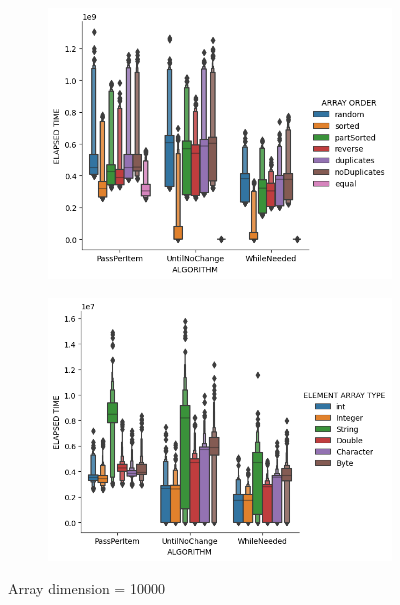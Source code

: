 \documentclass{article}
\begin{document}
\begin{figure}[H]
    \centering
    \begin{subfigure}[b]{0.4\textwidth}
        \centering
        \includegraphics[width=\textwidth]{./data/array_order_10000.png}
    \end{subfigure}
    \hfill
    \begin{subfigure}[b]{0.4\textwidth}
        \centering
        \includegraphics[width=\textwidth]{./data/array_type_10000.png}
    \end{subfigure}
    \caption{Array dimension = 10000}
\end{figure}
\end{document}
